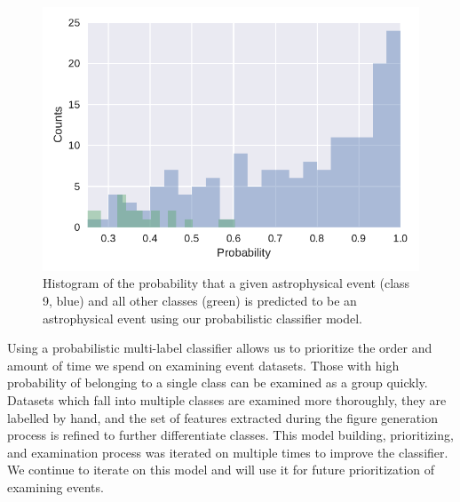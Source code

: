 \documentclass[a4paper,fleqn,usenatbib]{mnras}
\begin{document}
\begin{figure}
    \includegraphics[width=1.0\linewidth]{figures/class9_hist.pdf}
    \caption{Histogram of the probability that a given astrophysical event
    (class 9, blue) and all other classes (green) is predicted to be an
    astrophysical event using our probabilistic classifier model.
    }
    \label{fig:class_hist}
\end{figure}

Using a probabilistic multi-label classifier allows us to prioritize the order
and amount of time we spend on examining event datasets. Those with high
probability of belonging to a single class can be examined as a group quickly.
Datasets which fall into multiple classes are examined more thoroughly, they are
labelled by hand, and the set of features extracted during the figure generation
process is refined to further differentiate classes. This model building,
prioritizing, and examination process was iterated on multiple times to improve
the classifier. We continue to iterate on this model and will use it for future
prioritization of examining events.
\end{document}
